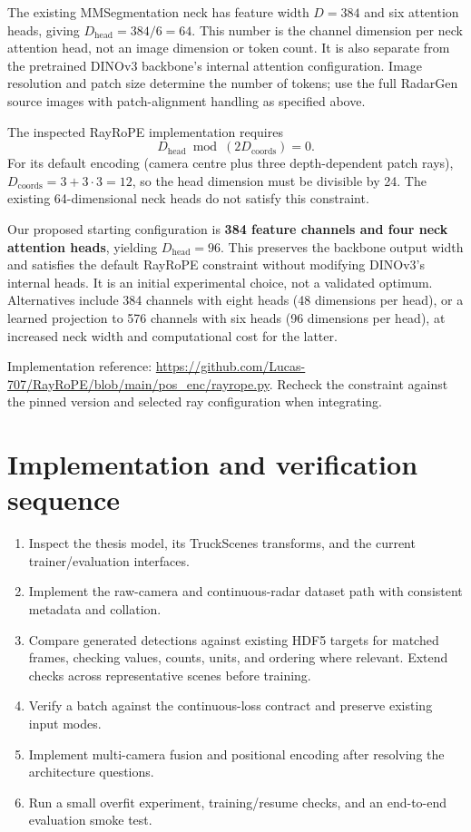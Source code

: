 \documentclass[11pt,a4paper]{article}
\begin{document}
The existing MMSegmentation neck has feature width $D=384$ and six attention heads, giving $D_{\mathrm{head}}=384/6=64$. This number is the channel dimension per neck attention head, not an image dimension or token count. It is also separate from the pretrained DINOv3 backbone's internal attention configuration. Image resolution and patch size determine the number of tokens; use the full RadarGen source images with patch-alignment handling as specified above.

The inspected RayRoPE implementation requires
\[
D_{\mathrm{head}}\bmod(2D_{\mathrm{coords}})=0.
\]
For its default encoding (camera centre plus three depth-dependent patch rays), $D_{\mathrm{coords}}=3+3\cdot3=12$, so the head dimension must be divisible by 24. The existing 64-dimensional neck heads do not satisfy this constraint.

Our proposed starting configuration is \textbf{384 feature channels and four neck attention heads}, yielding $D_{\mathrm{head}}=96$. This preserves the backbone output width and satisfies the default RayRoPE constraint without modifying DINOv3's internal heads. It is an initial experimental choice, not a validated optimum. Alternatives include 384 channels with eight heads (48 dimensions per head), or a learned projection to 576 channels with six heads (96 dimensions per head), at increased neck width and computational cost for the latter.

Implementation reference: \url{https://github.com/Lucas-707/RayRoPE/blob/main/pos_enc/rayrope.py}. Recheck the constraint against the pinned version and selected ray configuration when integrating.

\section{Implementation and verification sequence}
\begin{enumerate}
\item Inspect the thesis model, its TruckScenes transforms, and the current trainer/evaluation interfaces.
\item Implement the raw-camera and continuous-radar dataset path with consistent metadata and collation.
\item Compare generated detections against existing HDF5 targets for matched frames, checking values, counts, units, and ordering where relevant. Extend checks across representative scenes before training.
\item Verify a batch against the continuous-loss contract and preserve existing input modes.
\item Implement multi-camera fusion and positional encoding after resolving the architecture questions.
\item Run a small overfit experiment, training/resume checks, and an end-to-end evaluation smoke test.
\end{enumerate}
\end{document}
